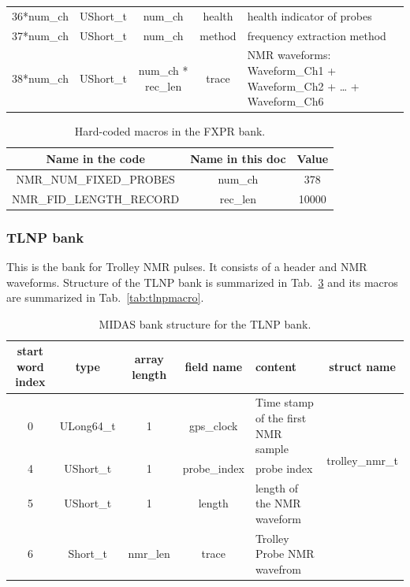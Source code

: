 \begin{table}[htbp]
\begin{tabular}{|c|c|c|c|p{4cm}|c|}
\cline{1-5}
36*num\_ch       & UShort\_t & num\_ch            & health     & health indicator of probes                                       &                             \\
\cline{1-5}
37*num\_ch       & UShort\_t & num\_ch            & method     & frequency extraction method                                      &                             \\
\cline{1-5}
38*num\_ch       & UShort\_t & num\_ch * rec\_len & trace      & NMR waveforms: Waveform\_Ch1 + Waveform\_Ch2 + … + Waveform\_Ch6 &     \\    
\hline
\end{tabular} 
\label{tab:fxprtable}
\end{table}

\begin{table}[htbp]
\centering
\caption{Hard-coded macros in the FXPR bank.}
\begin{tabular}{|c|c|c|}
\hline
Name in the code	& Name in this doc &	Value \\
\hline
NMR\_NUM\_FIXED\_PROBES & num\_ch & 378 \\
\hline
NMR\_FID\_LENGTH\_RECORD & rec\_len & 10000 \\
\hline
\end{tabular} 
\label{tab:fxprmacro}
\end{table}


\subsubsection*{TLNP bank}

This is the bank for Trolley NMR pulses. It consists of a header and NMR waveforms.
Structure of the TLNP bank is summarized in Tab.~\ref{tab:tlnptable} and its macros are summarized in Tab.~\ref{tab:tlnpmacro}.

\begin{table}[htbp]
\centering
\caption{MIDAS bank structure for the TLNP bank.}
\begin{tabular}{|c|c|c|c|p{4cm}|c|}
\hline
start word index &	type	& array length	&field name	&content	& struct name \\
\hline
0	& ULong64\_t & 1 & gps\_clock & Time stamp of the first NMR sample	& \multirow{3}{*}{trolley\_nmr\_t}   \\ 
\cline{1-5}
4	&UShort\_t	& 1 & probe\_index	&probe index	 & \\ 
\cline{1-5}
5	&UShort\_t	&1 & length&	length of the NMR waveform	 & \\ 
\hline
6	&Short\_t & nmr\_len &	trace	&Trolley Probe NMR wavefrom	 & \\ 
\hline
\end{tabular} 
\label{tab:tlnptable}
\end{table}

